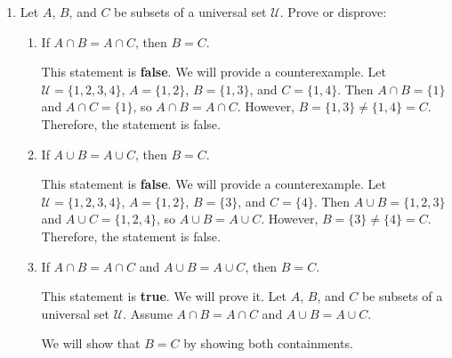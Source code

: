 \begin{enumerate}
\begin{enumerate}
\begin{subprove}
      \textbf{Reverse containment:} Let $x \in A \cup B$ be arbitrary.
      Then $x \in A$ or $x \in B$.
      If $x \in A$, then $x \in A \cup (B \setminus A)$.
      If $x \in B$, then either $x \in A$ or $x \notin A$.
      If $x \in A$, then $x \in A \cup (B \setminus A)$.
      If $x \notin A$, then $x \in B \setminus A$, so $x \in A \cup (B \setminus A)$.
      In all cases, $x \in A \cup (B \setminus A)$. Hence, $A \cup B \subseteq A \cup (B \setminus A)$.
      
      Since both containments hold, $A \cup (B \setminus A) = A \cup B$.
    \end{subprove}
  \end{enumerate}

  \item Let $A$, $B$, and $C$ be subsets of a universal set $\mathcal{U}$.
  Prove or disprove: 
  \begin{enumerate}
    \item If \(A \cap B = A \cap C\), then \(B = C\).
    \begin{subprove}
      This statement is \textbf{false}. We will provide a counterexample.
      Let $\mathcal{U} = \{1, 2, 3, 4\}$, $A = \{1, 2\}$, $B = \{1, 3\}$, and $C = \{1, 4\}$.
      Then $A \cap B = \{1\}$ and $A \cap C = \{1\}$, so $A \cap B = A \cap C$.
      However, $B = \{1, 3\} \neq \{1, 4\} = C$.
      Therefore, the statement is false.
    \end{subprove}
    
    \item If \(A \cup B = A \cup C\), then \(B = C\).
    \begin{subprove}
      This statement is \textbf{false}. We will provide a counterexample.
      Let $\mathcal{U} = \{1, 2, 3, 4\}$, $A = \{1, 2\}$, $B = \{3\}$, and $C = \{4\}$.
      Then $A \cup B = \{1, 2, 3\}$ and $A \cup C = \{1, 2, 4\}$, so $A \cup B = A \cup C$.
      However, $B = \{3\} \neq \{4\} = C$.
      Therefore, the statement is false.
    \end{subprove}
    
    \item If \(A \cap B = A \cap C\) and \(A \cup B = A \cup C\), then \(B = C\).
    \begin{subprove}
      This statement is \textbf{true}. We will prove it.
      Let $A$, $B$, and $C$ be subsets of a universal set $\mathcal{U}$.
      Assume $A \cap B = A \cap C$ and $A \cup B = A \cup C$.
      
      We will show that $B = C$ by showing both containments.
      

\end{subprove}
\end{enumerate}
\end{enumerate}
